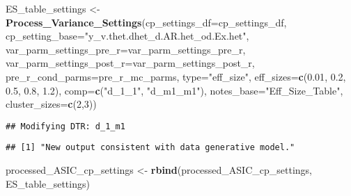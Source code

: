 \documentclass[
]{article}
\newenvironment{Shaded}{\begin{snugshade}}{\end{snugshade}}
\newcommand{\AttributeTok}[1]{\textcolor[rgb]{0.13,0.29,0.53}{#1}}
\newcommand{\CommentTok}[1]{\textcolor[rgb]{0.56,0.35,0.01}{\textit{#1}}}
\newcommand{\DecValTok}[1]{\textcolor[rgb]{0.00,0.00,0.81}{#1}}
\newcommand{\FloatTok}[1]{\textcolor[rgb]{0.00,0.00,0.81}{#1}}
\newcommand{\FunctionTok}[1]{\textcolor[rgb]{0.13,0.29,0.53}{\textbf{#1}}}
\newcommand{\NormalTok}[1]{#1}
\newcommand{\OtherTok}[1]{\textcolor[rgb]{0.56,0.35,0.01}{#1}}
\newcommand{\SpecialCharTok}[1]{\textcolor[rgb]{0.81,0.36,0.00}{\textbf{#1}}}
\newcommand{\StringTok}[1]{\textcolor[rgb]{0.31,0.60,0.02}{#1}}
\begin{document}
\begin{Shaded}
\begin{Highlighting}[]
\NormalTok{ES\_table\_settings }\OtherTok{\textless{}{-}} 
  \FunctionTok{Process\_Variance\_Settings}\NormalTok{(}\AttributeTok{cp\_settings\_df=}\NormalTok{cp\_settings\_df, }
                            \AttributeTok{cp\_setting\_base=}\StringTok{"y\_v.thet.dhet\_d.AR.het\_od.Ex.het"}\NormalTok{, }
                            \AttributeTok{var\_parm\_settings\_pre\_r=}\NormalTok{var\_parm\_settings\_pre\_r, }
                            \AttributeTok{var\_parm\_settings\_post\_r=}\NormalTok{var\_parm\_settings\_post\_r,}
                            \AttributeTok{pre\_r\_cond\_parms=}\NormalTok{pre\_r\_mc\_parms,}
                            \AttributeTok{type=}\StringTok{"eff\_size"}\NormalTok{, }
                            \AttributeTok{eff\_sizes=}\FunctionTok{c}\NormalTok{(}\FloatTok{0.01}\NormalTok{, }\FloatTok{0.2}\NormalTok{, }\FloatTok{0.5}\NormalTok{, }\FloatTok{0.8}\NormalTok{, }\FloatTok{1.2}\NormalTok{), }
                            \AttributeTok{comp=}\FunctionTok{c}\NormalTok{(}\StringTok{"d\_1\_1"}\NormalTok{, }\StringTok{"d\_m1\_m1"}\NormalTok{), }
                            \AttributeTok{notes\_base=}\StringTok{"Eff\_Size\_Table"}\NormalTok{, }
                            \AttributeTok{cluster\_sizes=}\FunctionTok{c}\NormalTok{(}\DecValTok{2}\NormalTok{,}\DecValTok{3}\NormalTok{))}
\end{Highlighting}
\end{Shaded}

\begin{verbatim}
## Modifying DTR: d_1_m1
\end{verbatim}

\begin{verbatim}
## [1] "New output consistent with data generative model."
\end{verbatim}

\begin{Shaded}
\begin{Highlighting}[]
\NormalTok{processed\_ASIC\_cp\_settings }\OtherTok{\textless{}{-}} \FunctionTok{rbind}\NormalTok{(processed\_ASIC\_cp\_settings, ES\_table\_settings)}
\end{Highlighting}
\end{Shaded}

\begin{Shaded}
\end{Shaded}
\end{document}
